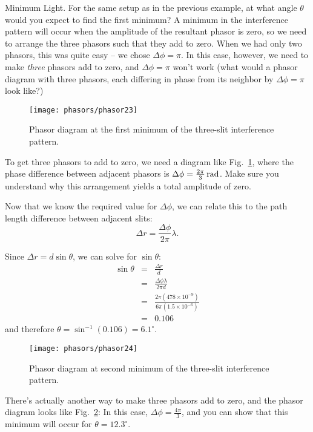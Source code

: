 \begin{exampleb}{Minimum Light.} 
For the same setup as in the previous example, 
at what angle $\theta$ would you expect to find the first minimum?
\solution
A minimum in the interference pattern will occur when the amplitude of
the resultant phasor is zero, so we need to arrange the three phasors
such that they add to zero. When we had only two phasors, this was
quite easy -- we chose $\Delta \phi = \pi$. In this case, however, we
need to make {\em three} phasors add to zero, and $\Delta \phi = \pi$
won't work (what would a phasor diagram with three phasors, each
differing in phase from its neighbor by $\Delta \phi = \pi$ look like?)

\begin{figure}\begin{center}
 \texttt{[image: phasors/phasor23]} 
\caption{\label{fig:phasor23}Phasor diagram at the first minimum of the three-slit
interference pattern.}
\end{center}
\end{figure}
 

To get three phasors to add to zero, we need a diagram like
Fig.~\ref{fig:phasor23}, where the phase difference between adjacent
phasors is $\Delta\phi = \frac{2\pi}{3}\,\mbox{rad}$. Make sure you
understand why this arrangement yields a total amplitude of zero.

Now that we know the required value for $\Delta\phi$, we can relate
this to the path length difference between adjacent slits:
\begin{equation}
\Delta r = \frac{\Delta\phi}{2\pi} \lambda.
\end{equation} 

Since $\Delta r = d\sin{\theta}$, we can solve for $\sin{\theta}$:
\begin{eqnarray*}
\sin{\theta} & = & \frac{\Delta r}{d} \\
             & = & \frac{\Delta\phi\lambda}{2\pi d} \\
             & = & \frac{2\pi(478 \times 10^{-9})}{6 \pi (1.5 \times 10^{-6})}\\
             & = & 0.106
\end{eqnarray*}
and therefore $\theta = \sin^{-1}{(0.106)} = 6.1^\circ$.


\begin{figure}
\begin{center}
 \texttt{[image: phasors/phasor24]}
\caption{\label{fig:phasor24}Phasor diagram at second minimum of the
 three-slit interference pattern.
}
\end{center}
\end{figure}

There's actually another way to make three phasors add to zero, and
the phasor diagram looks like Fig.~\ref{fig:phasor24}:
In this case, $\Delta\phi = \frac{4\pi}{3}$, and you can show that
this minimum will occur for $\theta = 12.3^\circ$.
\end{exampleb}

